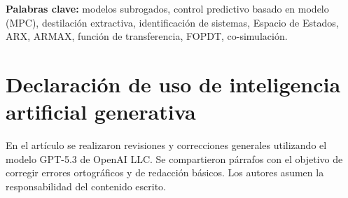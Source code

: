 \documentclass[10pt,twoside]{article}
\begin{document}
\medskip
\noindent\textbf{Palabras clave:} modelos subrogados, control predictivo basado en 
modelo (MPC), destilación extractiva, identificación de sistemas, Espacio de Estados, 
ARX, ARMAX, función de transferencia, FOPDT, co-simulación.











\section{Declaración de uso de inteligencia artificial generativa}

En el artículo se realizaron revisiones y correcciones generales utilizando el modelo GPT-5.3 de OpenAI LLC. Se compartieron párrafos con el objetivo de corregir errores ortográficos y de redacción básicos. Los autores asumen la responsabilidad del contenido escrito.

\clearpage

\printbibliography


\clearpage


\end{document}
